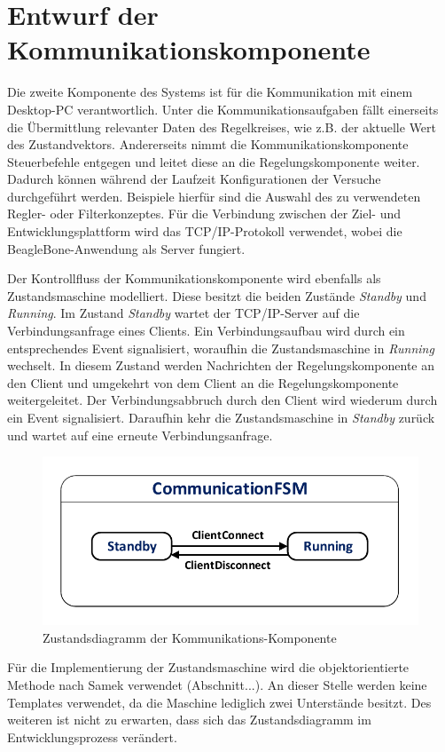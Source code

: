 \section{Entwurf der Kommunikationskomponente}
Die zweite Komponente des Systems ist für die Kommunikation mit einem Desktop-PC verantwortlich. Unter die Kommunikationsaufgaben fällt einerseits die Übermittlung relevanter Daten des Regelkreises, wie z.B. der aktuelle Wert des Zustandvektors. Andererseits nimmt die Kommunikationskomponente Steuerbefehle entgegen und leitet diese an die Regelungskomponente weiter. Dadurch können während der Laufzeit Konfigurationen der Versuche durchgeführt werden. Beispiele hierfür sind die Auswahl des zu verwendeten Regler- oder Filterkonzeptes. Für die Verbindung zwischen der Ziel- und Entwicklungsplattform wird das TCP/IP-Protokoll verwendet, wobei die BeagleBone-Anwendung als Server fungiert.

Der Kontrollfluss der Kommunikationskomponente wird ebenfalls als Zustandsmaschine modelliert. Diese besitzt die beiden Zustände \textit{Standby} und \textit{Running}. Im Zustand \textit{Standby} wartet der TCP/IP-Server auf die Verbindungsanfrage eines Clients. Ein Verbindungsaufbau wird durch ein entsprechendes Event signalisiert, woraufhin die Zustandsmaschine in \textit{Running} wechselt. In diesem Zustand werden Nachrichten der Regelungskomponente an den Client und umgekehrt von dem Client an die Regelungskomponente weitergeleitet. Der Verbindungsabbruch durch den Client wird wiederum durch ein Event signalisiert. Daraufhin kehr die Zustandsmaschine in \textit{Standby} zurück und wartet auf eine erneute Verbindungsanfrage.
\begin{figure}[h!]
\centering
\includegraphics[width=0.7\linewidth]{img/SW_4_CommComp_SC.pdf}
\caption{Zustandsdiagramm der Kommunikations-Komponente}
\end{figure}
Für die Implementierung der Zustandsmaschine wird die objektorientierte Methode nach Samek verwendet (Abschnitt...). An dieser Stelle werden keine Templates verwendet, da die Maschine lediglich zwei Unterstände besitzt. Des weiteren ist nicht zu erwarten, dass sich das Zustandsdiagramm im Entwicklungsprozess verändert.

